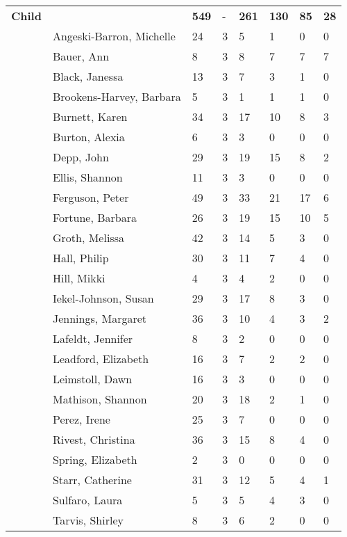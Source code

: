\documentclass{article}\usepackage[]{graphicx}\usepackage[]{color}
\begin{document}
{\begin{longtable} { >{\raggedright}p{}p{}p{}p{}p{}p{}p{}p{}}
\textbf{Child} &  & \textbf{549} & - & \textbf{261} & \textbf{130} & \textbf{85} & \textbf{28} \\ 
   & Angeski-Barron, Michelle & 24 & 3 & 5 & 1 & 0 & 0 \\ 
   & Bauer, Ann & 8 & 3 & 8 & 7 & 7 & 7 \\ 
   & Black, Janessa & 13 & 3 & 7 & 3 & 1 & 0 \\ 
   \rowcolor[gray]{0.90} & Brookens-Harvey, Barbara & 5 & 3 & 1 & 1 & 1 & 0 \\ 
   \rowcolor[gray]{0.90} & Burnett, Karen & 34 & 3 & 17 & 10 & 8 & 3 \\ 
   \rowcolor[gray]{0.90} & Burton, Alexia & 6 & 3 & 3 & 0 & 0 & 0 \\ 
   & Depp, John & 29 & 3 & 19 & 15 & 8 & 2 \\ 
   & Ellis, Shannon & 11 & 3 & 3 & 0 & 0 & 0 \\ 
   & Ferguson, Peter & 49 & 3 & 33 & 21 & 17 & 6 \\ 
   \rowcolor[gray]{0.90} & Fortune, Barbara & 26 & 3 & 19 & 15 & 10 & 5 \\ 
   \rowcolor[gray]{0.90} & Groth, Melissa & 42 & 3 & 14 & 5 & 3 & 0 \\ 
   \rowcolor[gray]{0.90} & Hall, Philip & 30 & 3 & 11 & 7 & 4 & 0 \\ 
   & Hill, Mikki & 4 & 3 & 4 & 2 & 0 & 0 \\ 
   & Iekel-Johnson, Susan & 29 & 3 & 17 & 8 & 3 & 0 \\ 
   & Jennings, Margaret & 36 & 3 & 10 & 4 & 3 & 2 \\ 
   \rowcolor[gray]{0.90} & Lafeldt, Jennifer & 8 & 3 & 2 & 0 & 0 & 0 \\ 
   \rowcolor[gray]{0.90} & Leadford, Elizabeth & 16 & 3 & 7 & 2 & 2 & 0 \\ 
   \rowcolor[gray]{0.90} & Leimstoll, Dawn & 16 & 3 & 3 & 0 & 0 & 0 \\ 
   & Mathison, Shannon & 20 & 3 & 18 & 2 & 1 & 0 \\ 
   & Perez, Irene & 25 & 3 & 7 & 0 & 0 & 0 \\ 
   & Rivest, Christina & 36 & 3 & 15 & 8 & 4 & 0 \\ 
   \rowcolor[gray]{0.90} & Spring, Elizabeth & 2 & 3 & 0 & 0 & 0 & 0 \\ 
   \rowcolor[gray]{0.90} & Starr, Catherine & 31 & 3 & 12 & 5 & 4 & 1 \\ 
   \rowcolor[gray]{0.90} & Sulfaro, Laura & 5 & 3 & 5 & 4 & 3 & 0 \\ 
   & Tarvis, Shirley & 8 & 3 & 6 & 2 & 0 & 0 \\ 

\end{longtable}}
\end{document}
